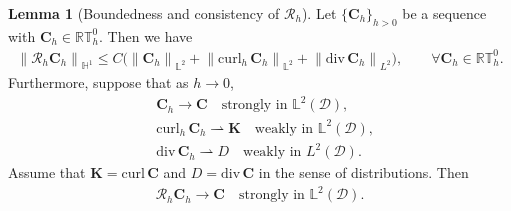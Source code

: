 \documentclass[11pt, reqno]{amsart}
\theoremstyle{definition}
\newtheorem{lemma}[theorem]{Lemma}
\numberwithin{equation}{section}
\newcommand{\curl}{\mathrm{curl}\,}
\newcommand{\divg}{\mathrm{div}\,}
\newcommand{\bff}{\boldsymbol}
\newcommand{\bb}{\mathbb}
\newcommand{\norm}[2]{\left\|{#1}\right\|_{#2}}
\newcommand{\curlh}{\mathrm{curl}_h\,}
\begin{document}
\begin{lemma}[Boundedness and consistency of $\mathcal{R}_h$]
	\label{lem:conv reconstruction consistency}
	Let $\{\bff C_h\}_{h>0}$ be a sequence with $\bff C_h\in\bb{RT}_h^0$. Then we have
	\begin{align}\label{equ:Maxwell reconstruction stability}
		\norm{\mathcal{R}_h\bff{C}_h}{\bb{H}^1}
		\leq
		C\bigl(\norm{\bff{C}_h}{\bb{L}^2}+\norm{\curlh\bff{C}_h}{\bb{L}^2}+\norm{\divg\bff{C}_h}{L^2}\bigr),
		\qquad
		\forall \bff{C}_h\in\bb{RT}_h^0.
	\end{align}
	Furthermore, suppose that as $h\to 0$,
	\begin{align*}
		&\bff C_h\to\bff C\quad\text{strongly in }\bb L^2(\mathscr D),
		\\
		&\curlh\bff C_h\rightharpoonup\bff K\quad\text{weakly in }\bb L^2(\mathscr D),
		\\
		&\divg\bff C_h\rightharpoonup D\quad\text{weakly in }L^2(\mathscr D).
	\end{align*}
	Assume that $\bff K=\curl\bff C$ and $D=\divg\bff C$
	in the sense of distributions. Then
	\begin{align}
		\label{equ:recon consistency conclusion}
		\mathcal R_h\bff C_h\to\bff C
		\quad\text{strongly in }\bb L^2(\mathscr D).
	\end{align}
\end{lemma}
\end{document}

